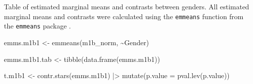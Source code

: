 \documentclass[
  bookmarksnumbered]{article}
\newenvironment{Shaded}{\begin{snugshade}}{\end{snugshade}}
\newcommand{\AttributeTok}[1]{\textcolor[rgb]{0.80,0.80,0.80}{#1}}
\newcommand{\FunctionTok}[1]{\textcolor[rgb]{0.94,0.94,0.56}{#1}}
\newcommand{\NormalTok}[1]{\textcolor[rgb]{0.80,0.80,0.80}{#1}}
\newcommand{\OtherTok}[1]{\textcolor[rgb]{0.94,0.94,0.56}{#1}}
\newcommand{\SpecialCharTok}[1]{\textcolor[rgb]{0.86,0.64,0.64}{#1}}
\begin{document}
Table of estimated marginal means and contrasts between genders. All estimated marginal means and contrasts were calculated using the \texttt{emmeans} function from the \texttt{emmeans} package \autocite{emmeanscit}.

\begin{Shaded}
\begin{Highlighting}[]
\NormalTok{emms.m1b1 }\OtherTok{\textless{}{-}} \FunctionTok{emmeans}\NormalTok{(m1b\_norm, }\SpecialCharTok{\textasciitilde{}}\NormalTok{Gender)}

\NormalTok{emms.m1b1.tab }\OtherTok{\textless{}{-}} \FunctionTok{tibble}\NormalTok{(}\FunctionTok{data.frame}\NormalTok{(emms.m1b1))}

\NormalTok{t.m1b1 }\OtherTok{\textless{}{-}} \FunctionTok{contr.stars}\NormalTok{(emms.m1b1) }\SpecialCharTok{|\textgreater{}}
  \FunctionTok{mutate}\NormalTok{(}\AttributeTok{p.value =} \FunctionTok{pval.lev}\NormalTok{(p.value))}


\end{Highlighting}
\end{Shaded}
\end{document}
